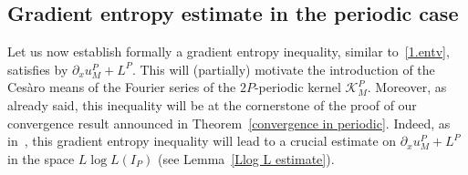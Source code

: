 \documentclass[11pt]{amsart}
\newcommand{\K}{\mathcal{K}}
\newcommand{\pa}{\partial}
\begin{document}
 \subsection{Gradient entropy estimate in the periodic case}\label{subsec.gredentperio}

Let us now establish formally a gradient entropy inequality, similar to~\eqref{1.entv}, satisfies by $\pa_x u^P_M+L^P$. This will (partially) motivate the introduction of 
 the Ces\`aro means of the Fourier series of the $2P$-periodic kernel  $\K^P_M$. 
 Moreover, as already said, this inequality will be at the cornerstone  of the proof of our convergence result announced in Theorem~\ref{convergence in periodic}. Indeed, as in~\cite{1}, this gradient entropy inequality will lead to a crucial estimate on $\pa_x u^P_M + L^P$ in the space $L \log L(I_P)$ (see Lemma~\ref{Llog L estimate}).
 
\end{document}
